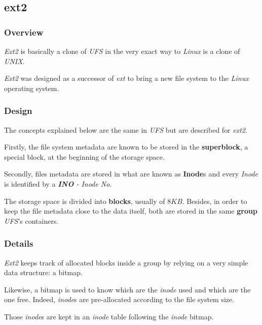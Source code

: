 
\subsection{ext2}


\begin{frame}
  \frametitle{Overview}

  \textit{Ext2} is basically a clone of \textit{UFS} in the very exact way
  to \textit{Linux} is a clone of \textit{UNIX}.

  \-

  \textit{Ext2} was designed as a successor of \textit{ext} to bring a new
  file system to the \textit{Linux} operating system.
\end{frame}


\begin{frame}
  \frametitle{Design}

  The concepts explained below are the same in \textit{UFS} but are described
  for \textit{ext2}.

  \-

  Firstly, the file system metadata are known to be stored in the
  \textbf{superblock}, a special block, at the beginning of the storage
  space.

  \-

  Secondly, files metadata are stored in what are known as \textbf{Inode}s
  and every \textit{Inode} is identified by a \textit{\textbf{INO} - Inode No}.

  \-

  The storage space is divided into \textbf{blocks}, usually of $8 KB$.
  Besides, in order to keep the file metadata close to the data itself,
  both are stored in the same \textbf{group} \ie{} \textit{UFS}'s
  containers.
\end{frame}


\begin{frame}
  \frametitle{Details}

  \textit{Ext2} keeps track of allocated blocks inside a group by relying
  on a very simple data structure: a bitmap.

  \-

  Likewise, a bitmap is used to know which are the \textit{inode} used and
  which are the one free. Indeed, \textit{inode}s are pre-allocated according
  to the file system size.

  \-

  Those \textit{inode}s are kept in an \textit{inode} table following the
  \textit{inode} bitmap.
\end{frame}


